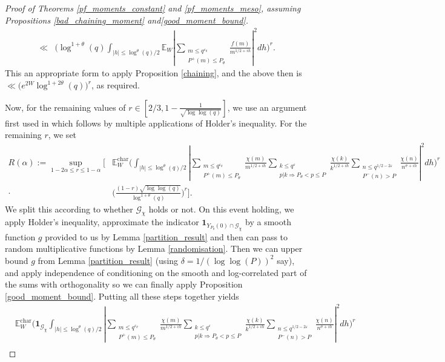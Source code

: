 \documentclass[reqno]{amsart}
\theoremstyle{definition}
\theoremstyle{remark}
\numberwithin{equation}{section}
\theoremstyle{remark}
\begin{document}
\begin{proof}[Proof of Theorems \ref{pf_moments_constant} and \ref{pf_moments_meso}, assuming Propositions \ref{bad_chaining_moment} and\ref{good_moment_bound}]
\begin{align*}
        \ll& \big(\log^{1+\theta}(q)\int_{|h| \leq \log^\theta(q)/2}\mathbb{E}_W|\sum_{\substack{m \leq q^{\varepsilon_\theta} \\ P^+(m) \leq P_\theta}}\frac{f(m)}{m^{1/2+ih}}|^2dh\big)^r. 
    \end{align*}
    This an appropriate form to apply Proposition \ref{chaining}, and the above then is
    $\ll\bigg(e^{2W}\log^{1+2\theta}(q)\bigg)^r$,
    as required.\par
    Now, for the remaining values of $r \in [2/3,1-\frac{1}{\sqrt{\log\log(q)}}]$, we use an argument first used in \cite{aharper201} which follows by multiple applications of Holder's inequality. For the remaining $r$, we set
    \begin{align*}
        R(\alpha) := \sup_{1-2\alpha \leq r \leq 1-\alpha}\bigg[&\mathbb{E}_W^{\text{char}}\big(\int_{|h|\leq \log^\theta(q)/2}|\sum_{\substack{m \leq q^{\varepsilon_\theta} \\ P^+(m) \leq P_\theta}}\frac{\chi(m)}{m^{1/2+ih}}\sum_{\substack{k \leq q^{\varepsilon} \\ p|k \Rightarrow P_\theta < p \leq P}}\frac{\chi(k)}{k^{1/2+ih}}\sum_{\substack{n \leq q^{1/2-2\varepsilon} \\ P^{-}(n) > P}}\frac{\chi(n)}{n^{\sigma+ih}}|^2dh\big)^r \\
        \cdot& \big(\frac{(1-r)\sqrt{\log\log(q)}}{\log^{1+\theta}(q)}\big)^r\bigg].
    \end{align*}
    We split this according to whether $\mathcal{G}_\chi$ holds or not. On this event holding, we apply Holder's inequality, approximate the indicator $\mathbf{1}_{Y_{P_\theta}(0) \cap \mathcal{G}_\chi}$ by a smooth function $g$ provided to us by Lemma \ref{partition_result} and then can pass to random multiplicative functions by Lemma \ref{randomisation}. Then we can upper bound $g$ from Lemma \ref{partition_result} (using $\delta=1/(\log\log(P))^2$ say), and apply independence of conditioning on the smooth and log-correlated part of the sums with orthogonality so we can finally apply Proposition \ref{good_moment_bound}. Putting all these steps together yields
    \begin{align*}
        &\mathbb{E}_W^{\text{char}}\big(\mathbf{1}_{\mathcal{G}_\chi}\int_{|h|\leq \log^\theta(q)/2}|\sum_{\substack{m \leq q^{\varepsilon_\theta} \\ P^+(m) \leq P_\theta}}\frac{\chi(m)}{m^{1/2+ih}}\sum_{\substack{k \leq q^{\varepsilon} \\ p|k \Rightarrow P_\theta < p \leq P}}\frac{\chi(k)}{k^{1/2+ih}}\sum_{\substack{n \leq q^{1/2-2\varepsilon} \\ P^{-}(n) > P}}\frac{\chi(n)}{n^{\sigma+ih}}|^2dh\big)^r \\

\end{align*}
\end{proof}
\end{document}

